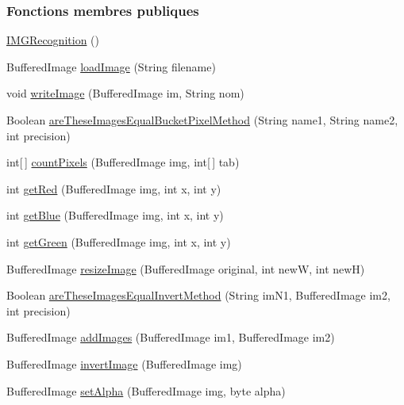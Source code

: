 \subsubsection*{Fonctions membres publiques}
\begin{DoxyCompactItemize}
\item 
\hyperlink{classIMGRecognition_a12b6f92bcc6cf51a70b4299b63dc07c9}{I\+M\+G\+Recognition} ()
\item 
Buffered\+Image \hyperlink{classIMGRecognition_a563c26081c02144dfcc6783886793532}{load\+Image} (String filename)
\item 
void \hyperlink{classIMGRecognition_aeffad758b71b49b25851a5a7f2727de8}{write\+Image} (Buffered\+Image im, String nom)
\item 
Boolean \hyperlink{classIMGRecognition_ab06b57744429b303220659775316f015}{are\+These\+Images\+Equal\+Bucket\+Pixel\+Method} (String name1, String name2, int precision)
\item 
int\mbox{[}$\,$\mbox{]} \hyperlink{classIMGRecognition_a8fad78515c21b2195c0866fbb8e4d348}{count\+Pixels} (Buffered\+Image img, int\mbox{[}$\,$\mbox{]} tab)
\item 
int \hyperlink{classIMGRecognition_ae370d79f59e42f1134776eb7d10a4d5b}{get\+Red} (Buffered\+Image img, int x, int y)
\item 
int \hyperlink{classIMGRecognition_abfc810952febb3c84254ee0e339605cf}{get\+Blue} (Buffered\+Image img, int x, int y)
\item 
int \hyperlink{classIMGRecognition_a4a2c4b182067edf9853b2974fc7d0893}{get\+Green} (Buffered\+Image img, int x, int y)
\item 
Buffered\+Image \hyperlink{classIMGRecognition_a58dea1e82edb9095160cacbb60e74dc4}{resize\+Image} (Buffered\+Image original, int new\+W, int new\+H)
\item 
Boolean \hyperlink{classIMGRecognition_aabdc590dd4a074972106c61b6013f7aa}{are\+These\+Images\+Equal\+Invert\+Method} (String im\+N1, Buffered\+Image im2, int precision)
\item 
Buffered\+Image \hyperlink{classIMGRecognition_a6fe8d29184cea9a3d6492aef6dbe9b8e}{add\+Images} (Buffered\+Image im1, Buffered\+Image im2)
\item 
Buffered\+Image \hyperlink{classIMGRecognition_a58a3b199e12c2f45c5b2841bf7779353}{invert\+Image} (Buffered\+Image img)
\item 
Buffered\+Image \hyperlink{classIMGRecognition_a6bcc57c1f558a08072c8deab1960d479}{set\+Alpha} (Buffered\+Image img, byte alpha)
\item 

\end{DoxyCompactItemize}
